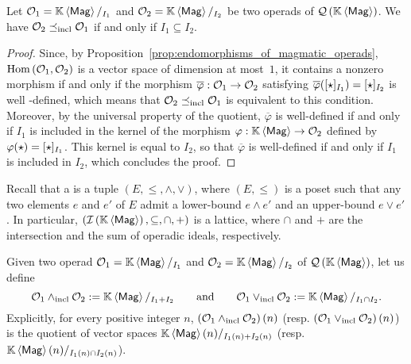 \begin{Proposition} \label{prop:order_relations_on_QMag_and_ideals}
    Let $\mathcal{O}_1=\mathbb{K} \left\langle\mathsf{Mag}\right\rangle/_{I_1}$ and $\mathcal{O}_2=\mathbb{K} \left\langle\mathsf{Mag}\right\rangle/_{I_2}$ be two operads
    of $\mathcal{Q}\left(\mathbb{K} \left\langle\mathsf{Mag}\right\rangle\right)$. We have $\mathcal{O}_2\preceq_{\mathrm{incl}}\mathcal{O}_1$ if and only if
    $I_1\subseteq I_2$.
\end{Proposition}
\begin{proof}
  Since, by Proposition~\ref{prop:endomorphisms_of_magmatic_operads},
  $\mathrm{Hom}\left(\mathcal{O}_1,\mathcal{O}_2\right)$ is a vector space of
  dimension at most~$1$, it contains a nonzero morphism if and only if
  the morphism $\overline{\varphi}:\mathcal{O}_1\to\mathcal{O}_2$ satisfying
  $\overline{\varphi}([\operatorname{\star}]_{I_1})=[\operatorname{\star}]_{I_2}$ is well
  -defined, which means that $\mathcal{O}_2\preceq_{\mathrm{incl}}\mathcal{O}_1$ is equivalent to this
  condition. Moreover, by the universal property of the quotient,
  $\overline{\varphi}$ is well-defined if and only if $I_1$ is included
  in the kernel of the morphism $\varphi:\mathbb{K} \left\langle\mathsf{Mag}\right\rangle\to\mathcal{O}_2$ defined by
  $\varphi(\operatorname{\star})=[\operatorname{\star}]_{I_1}$. This kernel is equal to
  $I_2$, so that $\overline{\varphi}$ is well-defined if and only if
  $I_1$ is included in $I_2$, which concludes the proof.
\end{proof}
\medbreak

Recall that a  is a tuple
$\left(E,\leq,\wedge,\vee\right)$, where $\left(E,\leq\right)$ is a
poset such that any two elements $e$ and $e'$ of $E$ admit a lower-bound
$e\wedge e'$ and an upper-bound $e\vee e'$. In particular,
$\left(\mathcal{I}\left(\mathbb{K} \left\langle\mathsf{Mag}\right\rangle\right),\subseteq,\cap,+\right)$ is a lattice, where $\cap$ and $+$
are the intersection and the sum of operadic ideals, respectively.
\medbreak

Given two operad $\mathcal{O}_1=\mathbb{K} \left\langle\mathsf{Mag}\right\rangle/_{I_1}$ and $\mathcal{O}_2=\mathbb{K} \left\langle\mathsf{Mag}\right\rangle/_{I_2}$ of
$\mathcal{Q}\left(\mathbb{K} \left\langle\mathsf{Mag}\right\rangle\right)$, let us define
\begin{equation} \label{equ:definition_of_lattice_operations_of_QMag}
    \mathcal{O}_1\wedge_{\mathrm{incl}} \mathcal{O}_2 := \mathbb{K} \left\langle\mathsf{Mag}\right\rangle/_{I_1+I_2}
    \qquad \mbox{and} \qquad
    \mathcal{O}_1\vee_{\mathrm{incl}} \mathcal{O}_2 := \mathbb{K} \left\langle\mathsf{Mag}\right\rangle/_{I_1\cap I_2}.
\end{equation}
Explicitly, for every positive integer $n$,
$\left(\mathcal{O}_1\wedge_{\mathrm{incl}}\mathcal{O}_2\right)(n)$ (resp.
$\left(\mathcal{O}_1\vee_{\mathrm{incl}}\mathcal{O}_2\right)(n)$) is the quotient of vector spaces
$\mathbb{K} \left\langle\mathsf{Mag}\right\rangle(n)/_{I_1(n)+I_2(n)}$ (resp.
$\mathbb{K} \left\langle\mathsf{Mag}\right\rangle(n)/_{I_1(n)\cap I_2(n)}$).
\medbreak

